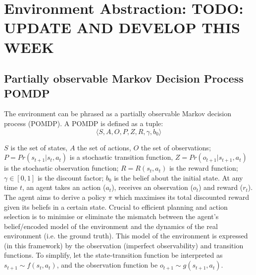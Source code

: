 \section{Environment Abstraction: TODO: UPDATE AND DEVELOP THIS WEEK}
\subsection{Partially observable Markov Decision Process POMDP}
The environment can be phrased as a partially observable Markov decision process (POMDP). 
A POMDP is defined as a tuple: 
\begin{equation}
    \langle S, A, O, P, Z, R, \gamma, b_0 \rangle
\end{equation}

\noindent$S$ is the set of states, $A$ the set of actions, $O$ the set of observations; 
\newline \newline  
$P = Pr(s_{t+1}|s_t, a_t)$ is a stochastic transition function, \newline \newline 
 $Z = Pr(o_{t+1}|s_{t+1},a_{t})$ is the stochastic observation function; 
 \newline \newline
 $R = R(s_t, a_t)$ is the reward function;
 \newline \newline
 $\gamma \in [0,1]$ is the discount factor;
 \newline \newline 
 $b_0$ is the belief about the initial state.
\newline \newline 
At any time $t$, an agent takes an action ($a_t$), receives an observation ($o_t$) and reward ($r_t$). The agent aims to derive a policy $\pi$ which maximises its total discounted reward given its beliefs in a certain state. 
\newline \newline
Crucial to efficient planning and action selection is to minimise or eliminate the mismatch between the agent's belief/encoded model of the environment and the dynamics of the real environment (i.e. the ground truth). This model of the environment is expressed (in this framework) by the observation (imperfect observability) and transition functions. 
\newline \newline
To simplify, let the state-transition function be interpreted as $s_{t+1} \sim f(s_t,a_t)$, and the observation function be $o_{t+1} \sim g(s_{t+1}, a_t)$. 
